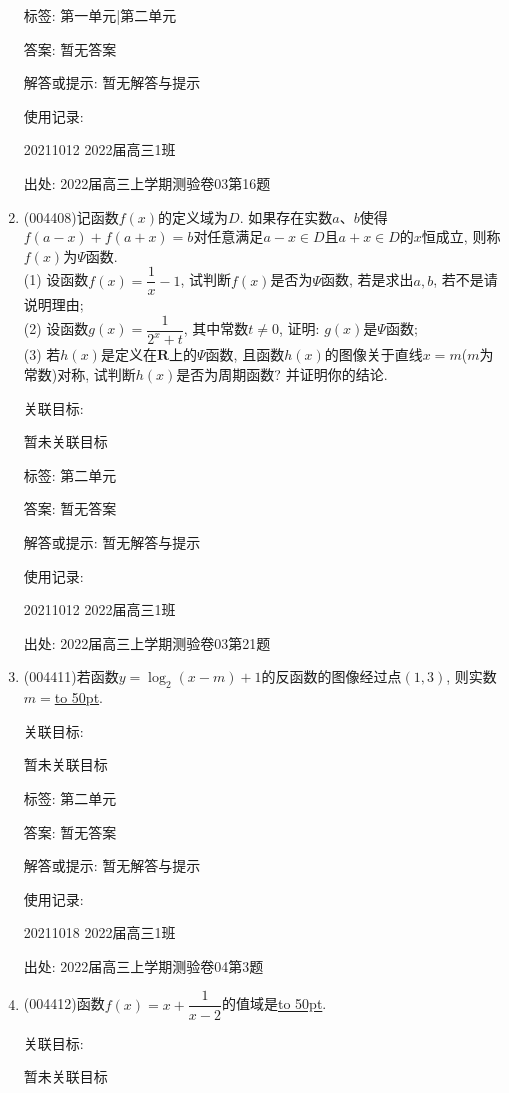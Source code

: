 \documentclass[10pt,a4paper]{article}
\newcommand{\blank}[1]{\underline{\hbox to #1pt{}}}
\begin{document}
\begin{enumerate}[1.]
标签: 第一单元|第二单元

答案: 暂无答案

解答或提示: 暂无解答与提示

使用记录:

20211012	2022届高三1班	


出处: 2022届高三上学期测验卷03第16题
\item { (004408)}记函数$f(x)$的定义域为$D$. 如果存在实数$a$、$b$使得$f(a-x)+f(a+x)=b$对任意满足$a-x\in D$且$a+x\in D$的$x$恒成立, 则称$f(x)$为$\Psi$函数.\\
(1) 设函数$f(x)=\dfrac 1x-1$, 试判断$f(x)$是否为$\Psi$函数, 若是求出$a,b$, 若不是请说明理由;\\
(2) 设函数$g(x)=\dfrac 1{2^x+t}$, 其中常数$t\ne 0$, 证明: $g(x)$是$\Psi$函数;\\
(3) 若$h(x)$是定义在$\mathbf{R}$上的$\Psi$函数, 且函数$h(x)$的图像关于直线$x=m$($m$为常数)对称, 试判断$h(x)$是否为周期函数? 并证明你的结论.


关联目标:

暂未关联目标



标签: 第二单元

答案: 暂无答案

解答或提示: 暂无解答与提示

使用记录:

20211012	2022届高三1班			


出处: 2022届高三上学期测验卷03第21题
\item { (004411)}若函数$y=\log_2(x-m)+1$的反函数的图像经过点$(1,3)$, 则实数$m=$\blank{50}.


关联目标:

暂未关联目标



标签: 第二单元

答案: 暂无答案

解答或提示: 暂无解答与提示

使用记录:

20211018	2022届高三1班	


出处: 2022届高三上学期测验卷04第3题
\item { (004412)}函数$f(x)=x+\dfrac 1{x-2}$的值域是\blank{50}.


关联目标:

暂未关联目标




\end{enumerate}
\end{document}
